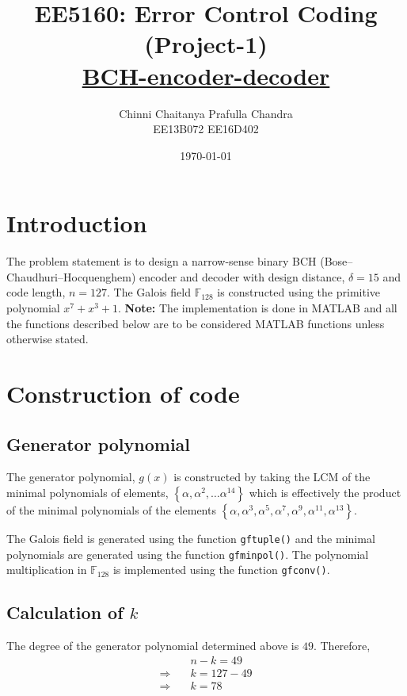 \documentclass[a4paper]{article}
\title{
	EE5160: Error Control Coding \\ 
    (Project-1) \\ 
    \underline{BCH-encoder-decoder}
}
\author{
	Chinni Chaitanya \quad \quad Prafulla Chandra \\
    EE13B072 \quad \quad EE16D402
}
\date{\today}
\begin{document}
\maketitle

\section{Introduction}
\label{sec:introduction}
The problem statement is to design a narrow-sense binary BCH (Bose–Chaudhuri–Hocquenghem) encoder and decoder with design distance, $\delta = 15$ and code length, $n = 127$. The Galois field $\mathbb{F}_{128}$ is constructed using the primitive polynomial $x^{7} + x^{3} + 1$. \newline \newline
\textbf{Note:} The implementation is done in MATLAB and all the functions described below are to be considered MATLAB functions unless otherwise stated.
\section{Construction of code}
\label{sec:construction}
\subsection{Generator polynomial}
The generator polynomial, $g(x)$ is constructed by taking the LCM of the minimal polynomials of elements, $\left\lbrace \alpha, \alpha^{2}, \hdots \alpha^{14} \right\rbrace$ which is effectively the product of the minimal polynomials of the elements $\left\lbrace \alpha, \alpha^{3}, \alpha^{5}, \alpha^{7}, \alpha^{9}, \alpha^{11}, \alpha^{13} \right\rbrace$.

The Galois field is generated using the function \texttt{gftuple()} and the minimal polynomials are generated using the function \texttt{gfminpol()}. The polynomial multiplication in $\mathbb{F}_{128}$ is implemented using the function \texttt{gfconv()}.

\subsection{Calculation of $k$}
The degree of the generator polynomial determined above is $49$. Therefore,
\begin{align*}
	&n-k = 49 \\
	\Longrightarrow \quad &k = 127-49 \\
	\Longrightarrow \quad &k = 78
\end{align*}
\end{document}
